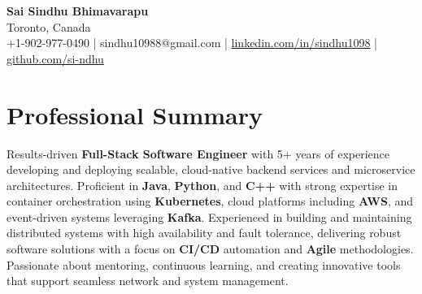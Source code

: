 \documentclass[letterpaper,11pt]{article}
\begin{document}
\begin{center}
  {\Large \textbf{Sai Sindhu Bhimavarapu}} \\
  Toronto, Canada \\
  +1-902-977-0490 \enspace | \enspace sindhu10988@gmail.com \enspace | \enspace \href{https://www.linkedin.com/in/sindhu1098/}{linkedin.com/in/sindhu1098} \enspace | \enspace \href{https://github.com/si-ndhu}{github.com/si-ndhu}
\end{center}

\section{Professional Summary}
  \begin{itemize}[leftmargin=0.15in, label={}]
    \small{\item{
     Results-driven \textbf{Full-Stack Software Engineer} with 5+ years of experience developing and deploying scalable, cloud-native backend services and microservice architectures. Proficient in \textbf{Java}, \textbf{Python}, and \textbf{C++} with strong expertise in container orchestration using \textbf{Kubernetes}, cloud platforms including \textbf{AWS}, and event-driven systems leveraging \textbf{Kafka}. Experienced in building and maintaining distributed systems with high availability and fault tolerance, delivering robust software solutions with a focus on \textbf{CI/CD} automation and \textbf{Agile} methodologies. Passionate about mentoring, continuous learning, and creating innovative tools that support seamless network and system management.
    }}
  \end{itemize}
\vspace{-16pt}

\end{document}
